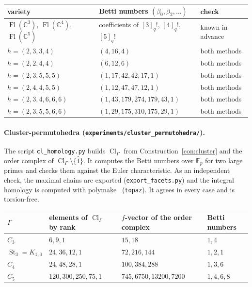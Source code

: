 \documentclass[11pt,a4paper]{article}
\numberwithin{equation}{section}
\theoremstyle{plain}
\theoremstyle{definition}
\theoremstyle{remark}
\newcommand{\C}{\mathbb{C}}
\DeclareMathOperator{\Fl}{Fl}
\DeclareMathOperator{\Cl}{Cl}
\DeclareMathOperator{\St}{St}
\begin{document}
\begin{center}
\begin{tabular}{@{}lll@{}}
\toprule
variety & Betti numbers $(\beta_0,\beta_2,\dots)$ & check\\
\midrule
$\Fl(\C^3)$, $\Fl(\C^4)$, $\Fl(\C^5)$ & coefficients of $[3]_q!$, $[4]_q!$, $[5]_q!$ & known in advance\\
$h=(2,3,3,4)$ & $(4,16,4)$ & both methods\\
$h=(2,2,4,4)$ & $(6,12,6)$ & both methods\\
$h=(2,3,5,5,5)$ & $(1,17,42,42,17,1)$ & both methods\\
$h=(2,4,4,5,5)$ & $(1,12,47,47,12,1)$ & both methods\\
$h=(2,3,4,6,6,6)$ & $(1,43,179,274,179,43,1)$ & both methods\\
$h=(2,3,5,5,6,6)$ & $(1,29,175,310,175,29,1)$ & both methods\\
\bottomrule
\end{tabular}
\end{center}

\paragraph{Cluster-permutohedra (\nolinkurl{experiments/cluster_permutohedra/}).}
The script \texttt{cl\_homology.py} builds $\Cl_\Gamma$ from Construction~\ref{con:cluster} and the order complex of $\Cl_\Gamma\setminus\{\hat1\}$. It computes the Betti numbers over $\mathbb F_p$ for two large primes and checks them against the Euler characteristic. As an independent check, the maximal chains are exported (\texttt{export\_facets.py}) and the integral homology is computed with polymake~\cite{GJ00} (\texttt{topaz}). It agrees in every case and is torsion-free.

\begin{center}
\begin{tabular}{@{}llll@{}}
\toprule
$\Gamma$ & elements of $\Cl_\Gamma$ by rank & $f$-vector of the order complex & Betti numbers\\
\midrule
$C_3$ & $6,9,1$ & $15,18$ & $1,4$\\
$\St_3=K_{1,3}$ & $24,36,12,1$ & $72,216,144$ & $1,2,1$\\
$C_4$ & $24,48,28,1$ & $100,384,288$ & $1,3,6$\\
$C_5$ & $120,300,250,75,1$ & $745,6750,13200,7200$ & $1,4,6,8$\\
\bottomrule
\end{tabular}
\end{center}
\end{document}
